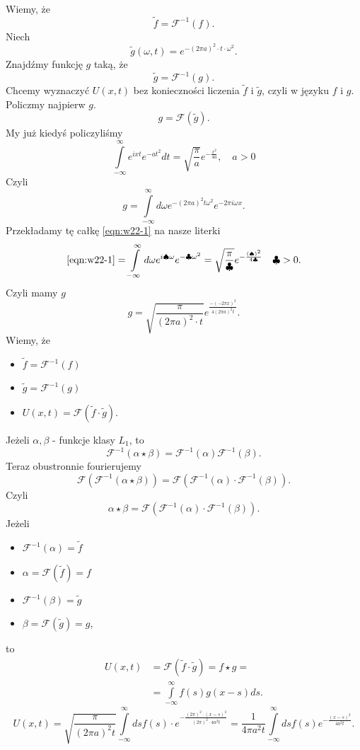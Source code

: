 \documentclass[../main.tex]{subfiles}
\begin{document}
Wiemy, że
\[
    \tilde f = \mathcal{F}^{-1}(f).
\]
Niech
\[
    \tilde g(\omega, t) = e^{-(2\pi a)^2 \cdot t \cdot \omega^2}.
\]
Znajdźmy funkcję $g$ taką, że
\[
    \tilde g = \mathcal{F}^{-1}(g)
.\]
Chcemy wyznaczyć $U(x,t)$ bez konieczności liczenia $\tilde f$ i $\tilde g$, czyli w języku $f$ i $g$. Policzmy najpierw $g$.
\[
    g = \mathcal{F}(\tilde g)
.\]
My już kiedyś policzyliśmy
\begin{equation}
    \label{eqn:w22-1}
    \int\limits_{-\infty}^{\infty} e^{ixt}e^{-at^2}dt = \sqrt{\frac{\pi}{a}} e^{-\frac{x^2}{4a}},\quad a > 0\tag{$\Delta$}
\end{equation}
Czyli
\[
    g = \int\limits_{-\infty}^{\infty} d\omega e^{-\left( 2\pi a \right)^2 t \omega^2}e^{-2\pi i \omega x}
.\]
Przekładamy tę całkę \eqref{eqn:w22-1} na nasze literki
\[
    \eqref{eqn:w22-1} = \int\limits_{-\infty}^{\infty} d\omega e^{i \spadesuit\omega}e^{-\clubsuit \omega^2} = \sqrt{\frac{\pi}{\clubsuit}}e^{-\frac{(\spadesuit)^2}{4\clubsuit}}\quad \clubsuit > 0
.\]
Czyli mamy $g$
\[
    g = \sqrt{\frac{\pi}{(2\pi a)^2 \cdot t}}e^{\frac{-(-2\pi x)^2}{4(2\pi a)^2t}}
.\]
Wiemy, że
\begin{itemize}
    \item $\tilde f = \mathcal{F}^{-1}(f)$
    \item $\tilde g = \mathcal{F}^{-1}(g)$
    \item $U(x,t) = \mathcal{F}(\tilde f \cdot \tilde g)$.
\end{itemize}
Jeżeli $\alpha, \beta$ - funkcje klasy $L_1$, to
\[
    \mathcal{F}^{-1}(\alpha\star\beta) = \mathcal{F}^{-1}(\alpha)\mathcal{F}^{-1}(\beta)
.\]
Teraz obustronnie fourierujemy
\[
    \mathcal{F}\left( \mathcal{F}^{-1}(\alpha\star \beta) \right) = \mathcal{F}\left( \mathcal{F}^{-1}(\alpha)\cdot \mathcal{F}^{-1}(\beta) \right)
.\]
Czyli
\[
    \alpha\star \beta = \mathcal{F}\left( \mathcal{F}^{-1}(\alpha)\cdot \mathcal{F}^{-1}(\beta) \right)
.\]
Jeżeli
\begin{itemize}
    \item $\mathcal{F}^{-1}(\alpha) = \tilde f$
    \item $\alpha = \mathcal{F}(\tilde f) = f$
    \item $\mathcal{F}^{-1}(\beta) = \tilde g$
    \item $\beta = \mathcal{F}(\tilde g) = g$,
\end{itemize}
to
\begin{align*}
    U(x,t) &= \mathcal{F}(\tilde f\cdot \tilde g) = f\star g =\\
    &= \int\limits_{-\infty}^{\infty} f(s)g(x-s)ds
.\end{align*}
\[
    U(x,t) = \sqrt{\frac{\pi}{(2\pi a)^2t}} \int\limits_{-\infty}^{\infty} ds f(s)\cdot e^{- \frac{(2\pi)^2\cdot (x-s)^2}{(2\pi)^2\cdot 4a^2t}} = \frac{1}{4 \pi a^2 t}\int\limits_{-\infty}^{\infty} ds f(s) e^{-\frac{(x-s)^2}{4a^2 t}}
.\]
\end{document}

